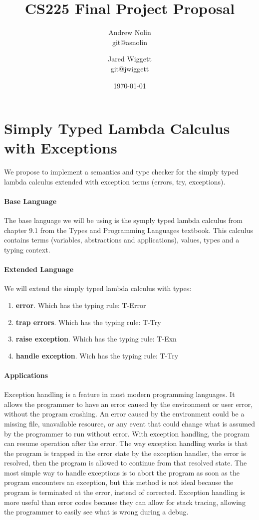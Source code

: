 \documentclass{article}
\title{CS225 Final Project Proposal}
\author{Andrew Nolin \\ git@asnolin \and Jared Wiggett \\ git@jwiggett}
\date{\today}
\begin{document}
\maketitle
\section*{Simply Typed Lambda Calculus with Exceptions}
We propose to implement a semantics and type checker for the simply typed lambda calculus extended with exception terms (errors, try, exceptions). 


\paragraph{Base Language}
The base language we will be using is the symply typed lambda calculus from chapter 9.1 from the Types and Programming Languages textbook. This calculus contains terms (variables, abstractions and  applications), values, types and a typing context.
\paragraph{Extended Language}
We will extend the simply typed lambda calculus with types: 
\begin{enumerate}
	\item \textbf{error}. Which has the typing rule: T-Error
	\item \textbf{trap errors}. Which has the typing rule: T-Try
	\item \textbf{raise exception}. Which has the typing rule: T-Exn
	\item \textbf{handle exception}. Wich has the typing rule: T-Try
\end{enumerate}
\paragraph{Applications}
Exception handling is a feature in most modern programming languages. It allows the programmer to have an error caused by the environment or user error, without the program crashing. An error caused by the environment could be a missing file, unavailable resource, or any event that could change what is assumed by the programmer to run without error. With exception handling, the program can resume operation after the error. The way exception handling works is that the program is trapped in the error state by the exception handler, the error is resolved, then the program is allowed to continue from that resolved state. The most simple way to handle exceptions is to abort the program as soon as the program encounters an exception, but this method is not ideal because the program is terminated at the error, instead of corrected. Exception handling is more useful than error codes because they can allow for stack tracing, allowing the programmer to easily see what is wrong during a debug.
\end{document}
